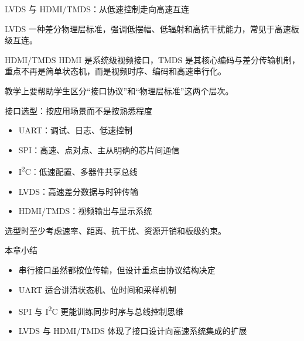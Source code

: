 \documentclass[aspectratio=169,11pt]{beamer}
\begin{document}
\begin{frame}{LVDS 与 HDMI/TMDS：从低速控制走向高速互连}
  \begin{block}{LVDS}
    一种差分物理层标准，强调低摆幅、低辐射和高抗干扰能力，常见于高速板级互连。
  \end{block}
  \begin{block}{HDMI/TMDS}
    HDMI 是系统级视频接口，TMDS 是其核心编码与差分传输机制，重点不再是简单状态机，而是视频时序、编码和高速串行化。
  \end{block}
  \vspace{0.5em}
  教学上要帮助学生区分“接口协议”和“物理层标准”这两个层次。
\end{frame}

\begin{frame}{接口选型：按应用场景而不是按熟悉程度}
  \begin{itemize}
    \item UART：调试、日志、低速控制
    \item SPI：高速、点对点、主从明确的芯片间通信
    \item I\textsuperscript{2}C：低速配置、多器件共享总线
    \item LVDS：高速差分数据与时钟传输
    \item HDMI/TMDS：视频输出与显示系统
  \end{itemize}
  \vspace{0.5em}
  选型时至少考虑速率、距离、抗干扰、资源开销和板级约束。
\end{frame}

\begin{frame}{本章小结}
  \begin{itemize}
    \item 串行接口虽然都按位传输，但设计重点由协议结构决定
    \item UART 适合讲清状态机、位时间和采样机制
    \item SPI 与 I\textsuperscript{2}C 更能训练同步时序与总线控制思维
    \item LVDS 与 HDMI/TMDS 体现了接口设计向高速系统集成的扩展
  \end{itemize}
\end{frame}
\end{document}
